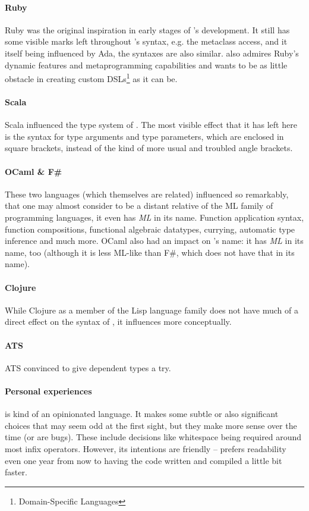 \paragraph{Ruby}
Ruby was the original inspiration in early stages of \Aml's development. It still has some visible marks left throughout \Aml's syntax, e.g. the metaclass access, and it itself being influenced by Ada, the syntaxes are also similar. \Aml also admires Ruby's dynamic features and metaprogramming capabilities and wants to be as little obstacle in creating custom DSLs\footnote{Domain-Specific Languages} as it can be. 

\paragraph{Scala}
Scala influenced the type system of \Aml. The most visible effect that it has left here is the syntax for type arguments and type parameters, which are enclosed in square brackets, instead of the kind of more usual and troubled angle brackets. 

\paragraph{OCaml \& F\#}
These two languages (which themselves are related) influenced \Aml so remarkably, that one may almost consider \Aml to be a distant relative of the ML family of programming languages, it even has {\em ML} in its name. Function application syntax, function compositions, functional algebraic datatypes, currying, automatic type inference and much more. OCaml also had an impact on \Aml's name: it has {\em ML} in its name, too (although it is less ML-like than F\#, which does not have that in its name). 

\paragraph{Clojure}
While Clojure as a member of the Lisp language family does not have much of a direct effect on the syntax of \Aml, it influences \Aml more conceptually. 

\paragraph{ATS}
ATS convinced \Aml to give dependent types a try. 

\paragraph{Personal experiences}
\Aml is kind of an opinionated language. It makes some subtle or also significant choices that may seem odd at the first sight, but they make more sense over the time (or are bugs). These include decisions like whitespace being required around most infix operators. However, its intentions are friendly -- \Aml prefers readability even one year from now to having the code written and compiled a little bit faster. 





